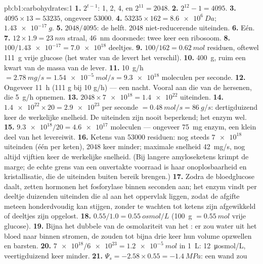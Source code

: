 \begin{solution}{pb:b1:carbohydrates:1}
\textbf{1.} $2^{t-1}$: 1, 2, 4, en $2^{11} = 2048$.
\textbf{2.} $2^{12} - 1 = 4095$.
\textbf{3.} $4095\times 13 = \num{53235}$, ongeveer \num{53000}.
\textbf{4.} $\num{53235}\times 162 = \qty{8.6e6}{Da}$;
$\qty{1.43e-17}{g}$.
\textbf{5.} $2048/4095$: de helft. \num{2048} niet-reducerende uiteinden.
\textbf{6.} Eén.
\textbf{7.} $12\times 1.9 = \qty{23}{nm}$ straal, \qty{46}{nm}
doorsnede: twee keer een ribosoom.
\textbf{8.} $100/\num{1.43e-17} = \num{7.0e18}$ deeltjes.
\textbf{9.} $100/162 = \qty{0.62}{mol}$ residuen, oftewel \qty{111}{g} vrije
glucose (het water van de  levert het verschil).
\textbf{10.} \qty{400}{g}, ruim een kwart van de massa van de lever.
\textbf{11.} \qty{10}{g/h} $= \qty{2.78}{mg/s} = \qty{1.54e-5}{mol/s} =
\num{9.3e18}$ moleculen per seconde.
\textbf{12.} Ongeveer \qty{11}{h} (111 g bij 10 g/h) --- een nacht. Vooral aan
die van de hersenen, die \qty{5}{g/h} opnemen.
\textbf{13.} $2048\times\num{7e18} = \num{1.4e22}$ uiteinden.
\textbf{14.} $\num{1.4e22}\times 20 = \num{2.9e23}$ per seconde $=
\qty{0.48}{mol/s} = \qty{86}{g/s}$: dertigduizend keer de werkelijke snelheid. De
uiteinden zijn nooit beperkend; het enzym wel.
\textbf{15.} $\num{9.3e18}/20 = \num{4.6e17}$ moleculen --- ongeveer
\qty{75}{mg} enzym, een klein deel van het levereiwit.
\textbf{16.} Ketens van \num{53000} residuen: nog steeds $\num{7e18}$ uiteinden
(één per keten), \num{2048} keer minder; maximale snelheid \qty{42}{mg/s}, nog
altijd vijftien keer de werkelijke snelheid. (Bij langere amyloseketens krimpt de
marge; de echte grens van een onvertakte voorraad is haar onoplosbaarheid en
kristallisatie, die de uiteinden buiten bereik brengen.)
\textbf{17.} Zodra de bloedglucose daalt, zetten hormonen het fosforylase binnen
seconden aan; het enzym vindt per deeltje duizenden uiteinden die al aan het
oppervlak liggen, zodat de afgifte meteen honderdvoudig kan stijgen, zonder te
wachten tot ketens zijn afgewikkeld of deeltjes zijn opgelost.
\textbf{18.} $0.55/1.0 = \qty{0.55}{osmol/L}$ (\qty{100}{g}
$= \qty{0.55}{mol}$ vrije glucose).
\textbf{19.} Bijna het dubbele van de osmolariteit van het : er zou water
uit het bloed naar binnen stromen, de  zouden tot bijna drie keer hun volume
opzwellen en barsten.
\textbf{20.} $\num{7e18}/\num{6e23} = \qty{1.2e-5}{mol}$ in \qty{1}{L}:
\qty{12}{\micro osmol/L}, veertigduizend keer minder.
\textbf{21.} $\Psi_s = -2.58\times 0.55 = \qty{-1.4}{MPa}$: een wand zou

\end{solution}
